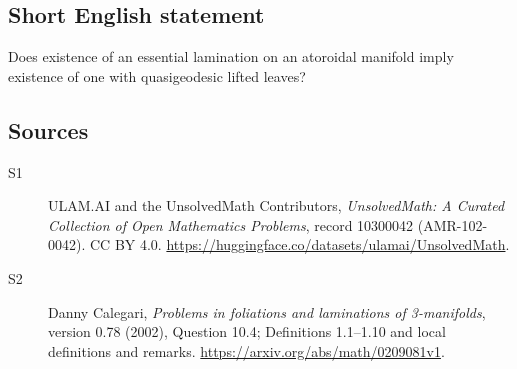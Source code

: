 \documentclass[11pt]{article}
\begin{document}
\subsection{Short English statement}
Does existence of an essential lamination on an atoroidal manifold imply existence of one with quasigeodesic lifted leaves?
\subsection{Sources}
\begin{description}
\item[\hypertarget{source:10300042:1}{S1}] ULAM.AI and the UnsolvedMath Contributors, \emph{UnsolvedMath: A Curated Collection of Open Mathematics Problems}, record 10300042 (AMR-102-0042). CC BY 4.0. \url{https://huggingface.co/datasets/ulamai/UnsolvedMath}.
\item[\hypertarget{source:10300042:2}{S2}] Danny Calegari, \emph{Problems in foliations and laminations of 3-manifolds}, version 0.78 (2002), Question 10.4; Definitions 1.1--1.10 and local definitions and remarks. \url{https://arxiv.org/abs/math/0209081v1}.
\end{description}
\label{end:10300042}
\end{document}
